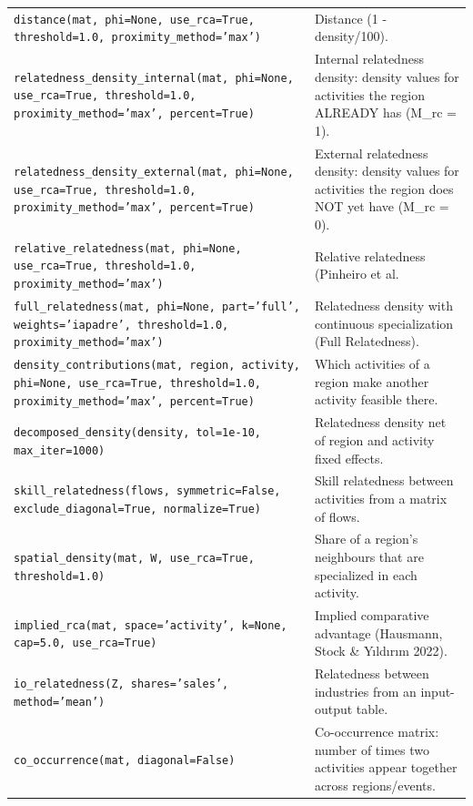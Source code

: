 \begin{longtable}{>{\raggedright\arraybackslash}p{9.2cm} >{\raggedright\arraybackslash}p{7.0cm}}
\texttt{\footnotesize distance(mat, phi=None, use\_rca=True, threshold=1.0, proximity\_method='max')} & {\small Distance (1 - density/100).} \\[2pt]
\texttt{\footnotesize relatedness\_density\_internal(mat, phi=None, use\_rca=True, threshold=1.0, proximity\_method='max', percent=True)} & {\small Internal relatedness density: density values for activities the region ALREADY has (M\_{rc} = 1).} \\[2pt]
\texttt{\footnotesize relatedness\_density\_external(mat, phi=None, use\_rca=True, threshold=1.0, proximity\_method='max', percent=True)} & {\small External relatedness density: density values for activities the region does NOT yet have (M\_{rc} = 0).} \\[2pt]
\texttt{\footnotesize relative\_relatedness(mat, phi=None, use\_rca=True, threshold=1.0, proximity\_method='max')} & {\small Relative relatedness (Pinheiro et al.} \\[2pt]
\texttt{\footnotesize full\_relatedness(mat, phi=None, part='full', weights='iapadre', threshold=1.0, proximity\_method='max')} & {\small Relatedness density with continuous specialization (Full Relatedness).} \\[2pt]
\texttt{\footnotesize density\_contributions(mat, region, activity, phi=None, use\_rca=True, threshold=1.0, proximity\_method='max', percent=True)} & {\small Which activities of a region make another activity feasible there.} \\[2pt]
\texttt{\footnotesize decomposed\_density(density, tol=1e-10, max\_iter=1000)} & {\small Relatedness density net of region and activity fixed effects.} \\[2pt]
\texttt{\footnotesize skill\_relatedness(flows, symmetric=False, exclude\_diagonal=True, normalize=True)} & {\small Skill relatedness between activities from a matrix of flows.} \\[2pt]
\texttt{\footnotesize spatial\_density(mat, W, use\_rca=True, threshold=1.0)} & {\small Share of a region's neighbours that are specialized in each activity.} \\[2pt]
\texttt{\footnotesize implied\_rca(mat, space='activity', k=None, cap=5.0, use\_rca=True)} & {\small Implied comparative advantage (Hausmann, Stock \& Yıldırım 2022).} \\[2pt]
\texttt{\footnotesize io\_relatedness(Z, shares='sales', method='mean')} & {\small Relatedness between industries from an input-output table.} \\[2pt]
\texttt{\footnotesize co\_occurrence(mat, diagonal=False)} & {\small Co-occurrence matrix: number of times two activities appear together across regions/events.} \\[2pt]

\end{longtable}
